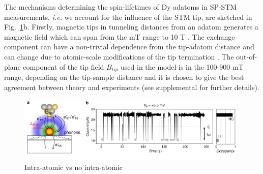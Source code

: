 \documentclass[
reprint,amsmath,amssymb,aps]{revtex4-2}
\begin{document}
The mechanisms determining the spin-lifetimes of Dy adatoms in SP-STM measurements, \textit{i.e.} we account for the influence of the STM tip, are sketched in Fig.~\ref{fig:no_tip_tip_telegraph}b.
Firstly, magnetic tips in tunneling distances from an adatom generates a magnetic field which can span from the mT range to 10 T \cite{yang2019}. The exchange component can have a non-trivial dependence from the tip-adatom distance and can change due to atomic-scale modifications of the tip termination \cite{hauptmannQuantifyingExchangeForces2020,tao_SwitchingSingleSpin_2009,lazoFirstprinciplesStudyMagnetic2011,lazoRoleTipSize2008,wieserTheoreticalStudyDynamical2013}. The out-of-plane component of the tip field $B_{tip}$ used in the model is in the 100-900 mT range, depending on the tip-sample distance and it is chosen to give the best agreement between theory and experiments (see supplemental for further details).
\begin{figure}[ht!]
\includegraphics[width=0.98\textwidth]{Fig2_new.pdf}
\caption{Intra-atomic vs no intra-atomic
\label{fig:no_tip_tip_telegraph} }
\end{figure}
\end{document}
